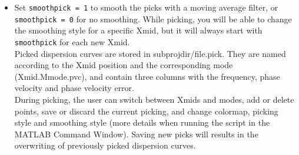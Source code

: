 \documentclass[twoside,a4paper]{article}
\begin{document}
\begin{itemize}
\item Set \verb|smoothpick = 1| to smooth the picks with a moving average filter, or \verb|smoothpick = 0| for no smoothing. While picking, you will be able to change the smoothing style for a specific Xmid, but it will always start with \verb|smoothpick| for each new Xmid.\\[2ex]
%
Picked dispersion curves are stored in subprojdir/file.pick. They are named according to the Xmid position and the corresponding mode (Xmid.Mmode.pvc), and contain three columns with the frequency, phase velocity and phase velocity error.\\[2ex]
%
During picking, the user can switch between Xmids and modes, add or delete points, save or discard the current picking, and change colormap, picking style and smoothing style (more details when running the script in the MATLAB Command Window). Saving new picks will results in the overwriting of previously picked dispersion curves.

\end{itemize}
\end{document}
